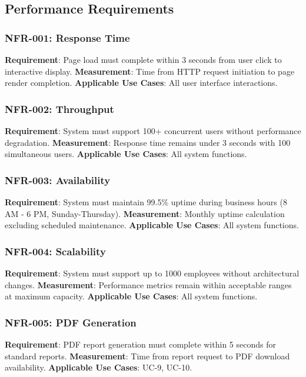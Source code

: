 \documentclass[12pt,a4paper]{article}
\begin{document}
\subsection{Performance Requirements}

\subsubsection{NFR-001: Response Time}
\textbf{Requirement}: Page load must complete within 3 seconds from user click to interactive display.
\textbf{Measurement}: Time from HTTP request initiation to page render completion.
\textbf{Applicable Use Cases}: All user interface interactions.

\subsubsection{NFR-002: Throughput}
\textbf{Requirement}: System must support 100+ concurrent users without performance degradation.
\textbf{Measurement}: Response time remains under 3 seconds with 100 simultaneous users.
\textbf{Applicable Use Cases}: All system functions.

\subsubsection{NFR-003: Availability}
\textbf{Requirement}: System must maintain 99.5\% uptime during business hours (8 AM - 6 PM, Sunday-Thursday).
\textbf{Measurement}: Monthly uptime calculation excluding scheduled maintenance.
\textbf{Applicable Use Cases}: All system functions.

\subsubsection{NFR-004: Scalability}
\textbf{Requirement}: System must support up to 1000 employees without architectural changes.
\textbf{Measurement}: Performance metrics remain within acceptable ranges at maximum capacity.
\textbf{Applicable Use Cases}: All system functions.

\subsubsection{NFR-005: PDF Generation}
\textbf{Requirement}: PDF report generation must complete within 5 seconds for standard reports.
\textbf{Measurement}: Time from report request to PDF download availability.
\textbf{Applicable Use Cases}: UC-9, UC-10.
\end{document}
